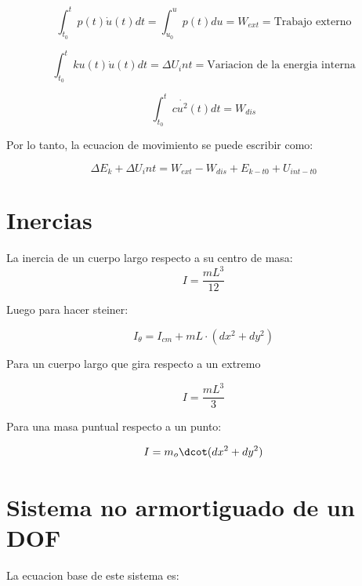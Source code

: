 \documentclass{article}  %
\begin{document}
\begin{equation}
    \int_{t_0}^{t} p(t) \dot{u}(t) dt = \int_{u_0}^{u} p(t) du = W_{ext} = \text{Trabajo externo}
\end{equation}

\begin{equation}
    \int_{t_0}^{t} k u(t) \dot{u}(t) dt = \Delta U_int = \text{Variacion de la energia interna}
\end{equation}

\begin{equation}
    \int_{t_0}^{t} c \dot{u^2}(t) dt = W_{dis}
\end{equation}

Por lo tanto, la ecuacion de movimiento se puede escribir como:

\begin{equation}
   \Delta E_k + \Delta U_int= W_{ext} - W_{dis} + {E_{k-t0} + U_{int-t0}} 
\end{equation}


\section{Inercias}

La inercia de un cuerpo largo respecto a su centro de masa:
\begin{equation}
    I = \frac{mL^3}{12}
\end{equation}

Luego para hacer steiner:

\begin{equation}
    I_{\theta} = I_{cm} + mL \cdot (dx^2 + dy^2)
\end{equation}

Para un cuerpo largo que gira respecto a un extremo

\begin{equation}
    I = \frac{mL^3}{3}
\end{equation}

Para una masa puntual respecto a un punto:

\begin{equation}
    I = m_o \dcot (dx^2 + dy^2)
\end{equation}



\newpage
\section{Sistema no armortiguado de un DOF}

La ecuacion base de este sistema es:
\end{document}
